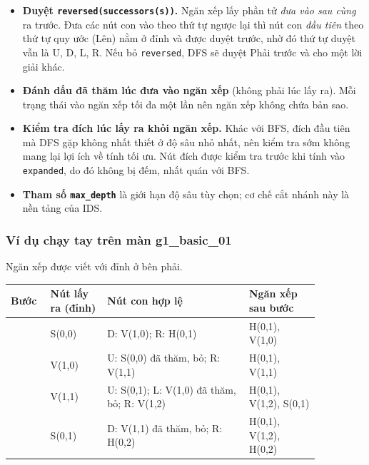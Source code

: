 \begin{itemize}
\item \textbf{Duyệt \texttt{reversed(successors(s))}.} Ngăn xếp lấy phần tử \emph{đưa vào sau cùng} ra trước. Đưa các nút con vào theo thứ tự ngược lại thì nút con \emph{đầu tiên} theo thứ tự quy ước (Lên) nằm ở đỉnh và được duyệt trước, nhờ đó thứ tự duyệt vẫn là U, D, L, R. Nếu bỏ \texttt{reversed}, DFS sẽ duyệt Phải trước và cho một lời giải khác.
\item \textbf{Đánh dấu đã thăm lúc đưa vào ngăn xếp} (không phải lúc lấy ra). Mỗi trạng thái vào ngăn xếp tối đa một lần nên ngăn xếp không chứa bản sao.
\item \textbf{Kiểm tra đích lúc lấy ra khỏi ngăn xếp.} Khác với BFS, đích đầu tiên mà DFS gặp không nhất thiết ở độ sâu nhỏ nhất, nên kiểm tra sớm không mang lại lợi ích về tính tối ưu. Nút đích được kiểm tra trước khi tính vào \texttt{expanded}, do đó không bị đếm, nhất quán với BFS.
\item \textbf{Tham số \texttt{max\_\allowbreak{}depth}} là giới hạn độ sâu tùy chọn; cơ chế cắt nhánh này là nền tảng của IDS.
\end{itemize}

\subsubsection{Ví dụ chạy tay trên màn g1\_basic\_01}

Ngăn xếp được viết với đỉnh ở bên phải.

{\renewcommand{\arraystretch}{1.25}
\begin{longtable}{|>{\raggedleft\arraybackslash}p{0.085\linewidth}|>{\raggedright\arraybackslash}p{0.161\linewidth}|>{\raggedright\arraybackslash}p{0.406\linewidth}|>{\raggedright\arraybackslash}p{0.208\linewidth}|}
\hline
\textbf{Bước} & \textbf{Nút lấy ra (đỉnh)} & \textbf{Nút con hợp lệ} & \textbf{Ngăn xếp sau bước} \\ \hline
\endhead
\hline
\endlastfoot
1 & S(0,0) & D: V(1,0); R: H(0,1) & H(0,1), V(1,0) \\ \hline
2 & V(1,0) & U: S(0,0) đã thăm, bỏ; R: V(1,1) & H(0,1), V(1,1) \\ \hline
3 & V(1,1) & U: S(0,1); L: V(1,0) đã thăm, bỏ; R: V(1,2) & H(0,1), V(1,2), S(0,1) \\ \hline
4 & S(0,1) & D: V(1,1) đã thăm, bỏ; R: H(0,2) & H(0,1), V(1,2), H(0,2) \\
\end{longtable}
}

